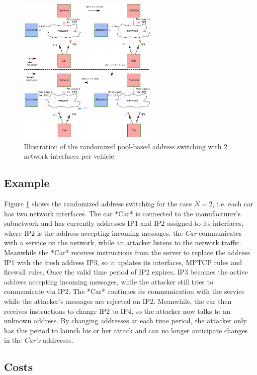 \begin{figure}[h]
    \centering
	\includegraphics[width=0.6\textwidth]{schema/new4.pdf}
    \caption{Illustration of the randomized pool-based address switching with 2 network interfaces per vehicle}
    \label{third}
\end{figure}

\subsection{ Example}

Figure \ref{third} shows the randomized address switching for the case
$N=2$, i.e. each car has two network interfaces. The car *Car* is
connected to the manufacturer's subnetwork and has currently addresses
IP1 and IP2 assigned to its interfaces, where IP2 is the address
accepting incoming messages. the \emph{Car} communicates with a service on
the network, while an attacker listens to the network
traffic. Meanwhile the *Car* receives instructions from the server to
replace the address IP1 with the fresh address IP3, so it updates its
interfaces, MPTCP rules and firewall rules. Once the valid time period
of IP2 expires, IP3 becomes the active address accepting incoming
messages, while the attacker still tries to communicate via IP2. The
*Car* continues its communication with the service while the
attacker's messages are rejected on IP2. Meanwhile, the car then
receives instructions to change IP2 to IP4, so the attacker now talks
to an unknown address. By changing addresses at each time period, the
attacker only has this period to launch his or her attack and can no
longer anticipate changes in the \emph{Car's} addresses.

\subsection{Costs}


